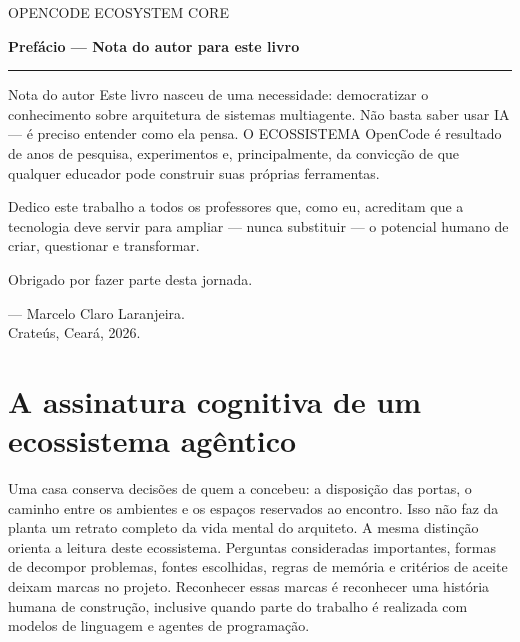 \begin{flushleft}
 {\small\sffamily\color{plumAccent}\MakeUppercase{OpenCode Ecosystem Core}\par}
\vspace{2mm}
 {\Large\sffamily\bfseries\color{textmain}Prefácio --- Nota do autor para este livro\par}
{\color{plumAccent}\rule{0.25\linewidth}{1.2pt}\par}
\end{flushleft}
\vspace{2mm}
\begin{elemento}{Nota do autor}{ \hfill {} \hfill {}}
Este livro nasceu de uma necessidade: democratizar o conhecimento sobre arquitetura de sistemas multiagente. Não basta saber usar IA --- é preciso entender como ela pensa. O ECOSSISTEMA OpenCode é resultado de anos de pesquisa, experimentos e, principalmente, da convicção de que qualquer educador pode construir suas próprias ferramentas.

Dedico este trabalho a todos os professores que, como eu, acreditam que a tecnologia deve servir para ampliar --- nunca substituir --- o potencial humano de criar, questionar e transformar.

Obrigado por fazer parte desta jornada.
\begin{flushright}
--- Marcelo Claro Laranjeira.\\ Crateús, Ceará, 2026.
\end{flushright}
\end{elemento}
\clearpage


\begingroup
{}
\let\prefaceoriginalfootnote\footnote
\renewcommand{\footnote}[1]{\prefaceoriginalfootnote{%
  \parbox[t]{\dimexpr\linewidth-1.8em\relax}{#1}}}
\section*{A assinatura cognitiva de um ecossistema agêntico}

Uma casa conserva decisões de quem a concebeu: a disposição das portas, o
caminho entre os ambientes e os espaços reservados ao encontro. Isso não faz
da planta um retrato completo da vida mental do arquiteto. A mesma distinção
orienta a leitura deste ecossistema. Perguntas consideradas importantes,
formas de decompor problemas, fontes escolhidas, regras de memória e critérios
de aceite deixam marcas no projeto. Reconhecer essas marcas é reconhecer uma
história humana de construção, inclusive quando parte do trabalho é realizada
com modelos de linguagem e agentes de programação.

